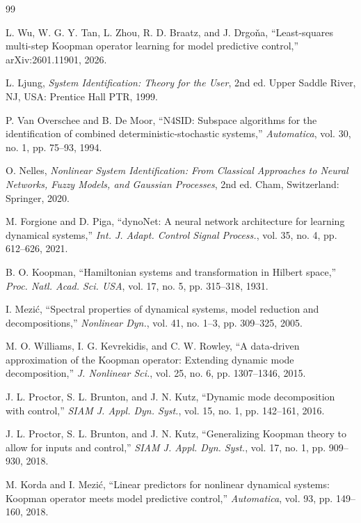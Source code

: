\documentclass[journal]{IEEEtran}
\begin{document}
\begin{thebibliography}{99}

L. Wu, W. G. Y. Tan, L. Zhou, R. D. Braatz, and J. Drgo\v{n}a, ``Least-squares multi-step Koopman operator learning for model predictive control,'' arXiv:2601.11901, 2026.

L. Ljung, \emph{System Identification: Theory for the User}, 2nd ed. Upper Saddle River, NJ, USA: Prentice Hall PTR, 1999.

P. Van Overschee and B. De Moor, ``N4SID: Subspace algorithms for the identification of combined deterministic-stochastic systems,'' \emph{Automatica}, vol. 30, no. 1, pp. 75--93, 1994.

O. Nelles, \emph{Nonlinear System Identification: From Classical Approaches to Neural Networks, Fuzzy Models, and Gaussian Processes}, 2nd ed. Cham, Switzerland: Springer, 2020.

M. Forgione and D. Piga, ``dynoNet: A neural network architecture for learning dynamical systems,'' \emph{Int. J. Adapt. Control Signal Process.}, vol. 35, no. 4, pp. 612--626, 2021.

B. O. Koopman, ``Hamiltonian systems and transformation in Hilbert space,'' \emph{Proc. Natl. Acad. Sci. USA}, vol. 17, no. 5, pp. 315--318, 1931.

I. Mezi\'c, ``Spectral properties of dynamical systems, model reduction and decompositions,'' \emph{Nonlinear Dyn.}, vol. 41, no. 1--3, pp. 309--325, 2005.

M. O. Williams, I. G. Kevrekidis, and C. W. Rowley, ``A data-driven approximation of the Koopman operator: Extending dynamic mode decomposition,'' \emph{J. Nonlinear Sci.}, vol. 25, no. 6, pp. 1307--1346, 2015.

J. L. Proctor, S. L. Brunton, and J. N. Kutz, ``Dynamic mode decomposition with control,'' \emph{SIAM J. Appl. Dyn. Syst.}, vol. 15, no. 1, pp. 142--161, 2016.

J. L. Proctor, S. L. Brunton, and J. N. Kutz, ``Generalizing Koopman theory to allow for inputs and control,'' \emph{SIAM J. Appl. Dyn. Syst.}, vol. 17, no. 1, pp. 909--930, 2018.

M. Korda and I. Mezi\'c, ``Linear predictors for nonlinear dynamical systems: Koopman operator meets model predictive control,'' \emph{Automatica}, vol. 93, pp. 149--160, 2018.


\end{thebibliography}
\end{document}
